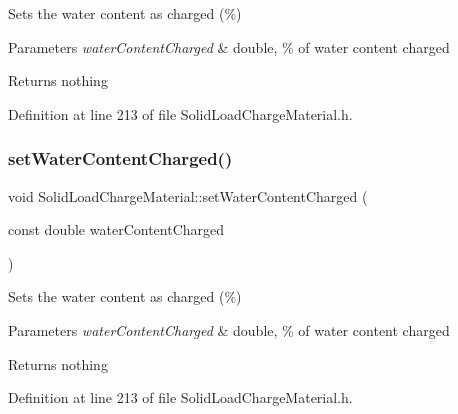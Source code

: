 Sets the water content as charged (\%) 
\begin{DoxyParams}{Parameters}
{\em water\+Content\+Charged} & double, \% of water content charged \\
\hline
\end{DoxyParams}
\begin{DoxyReturn}{Returns}
nothing 
\end{DoxyReturn}


Definition at line 213 of file Solid\+Load\+Charge\+Material.\+h.

\mbox{\label{class_solid_load_charge_material_abf43422318a1b9120dff1dcfb15d5265}} 
\subsubsection{\texorpdfstring{set\+Water\+Content\+Charged()}{setWaterContentCharged()}\hspace{0.1cm}{\footnotesize\ttfamily [2/3]}}
{\footnotesize\ttfamily void Solid\+Load\+Charge\+Material\+::set\+Water\+Content\+Charged (\begin{DoxyParamCaption}\item[{const double}]{water\+Content\+Charged }\end{DoxyParamCaption})\hspace{0.3cm}{\ttfamily [inline]}}

Sets the water content as charged (\%) 
\begin{DoxyParams}{Parameters}
{\em water\+Content\+Charged} & double, \% of water content charged \\
\hline
\end{DoxyParams}
\begin{DoxyReturn}{Returns}
nothing 
\end{DoxyReturn}


Definition at line 213 of file Solid\+Load\+Charge\+Material.\+h.

\mbox{\label{class_solid_load_charge_material_abf43422318a1b9120dff1dcfb15d5265}} 
